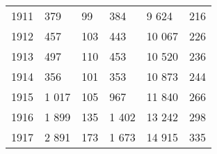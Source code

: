 \documentclass[leqno]{article}  %
\begin{document}
\begin{table}
{\begin{tabular}{p{}|p{}|p{}|p{}|p{}|p{}}
1911 & \hfill 379 \hspace*{2.5mm} & \hfill 99 \hspace*{2.5mm} & \hfill 384 \hspace*{2.5mm} & \hfill 9 624 \hspace*{2.5mm} & \hfill 216 \hspace*{2.5mm} \\
1912 & \hfill 457 \hspace*{2.5mm} & \hfill 103 \hspace*{2.5mm} & \hfill 443 \hspace*{2.5mm} & \hfill 10 067 \hspace*{2.5mm} & \hfill 226 \hspace*{2.5mm} \\
1913 & \hfill 497 \hspace*{2.5mm} & \hfill 110 \hspace*{2.5mm} & \hfill 453 \hspace*{2.5mm} & \hfill 10 520 \hspace*{2.5mm} & \hfill 236 \hspace*{2.5mm} \\
1914 & \hfill 356 \hspace*{2.5mm} & \hfill 101 \hspace*{2.5mm} & \hfill 353 \hspace*{2.5mm} & \hfill 10 873 \hspace*{2.5mm} & \hfill 244 \hspace*{2.5mm} \\
1915 & \hfill 1 017 \hspace*{2.5mm} & \hfill 105 \hspace*{2.5mm} & \hfill 967 \hspace*{2.5mm} & \hfill 11 840 \hspace*{2.5mm} & \hfill 266 \hspace*{2.5mm} \\
1916 & \hfill 1 899 \hspace*{2.5mm} & \hfill 135 \hspace*{2.5mm} & \hfill 1 402 \hspace*{2.5mm} & \hfill 13 242 \hspace*{2.5mm} & \hfill 298 \hspace*{2.5mm} \\
1917 & \hfill 2 891 \hspace*{2.5mm} & \hfill 173 \hspace*{2.5mm} & \hfill 1 673 \hspace*{2.5mm} & \hfill 14 915 \hspace*{2.5mm} & \hfill 335 \hspace*{2.5mm} \\

\end{tabular}}
\end{table}
\end{document}
